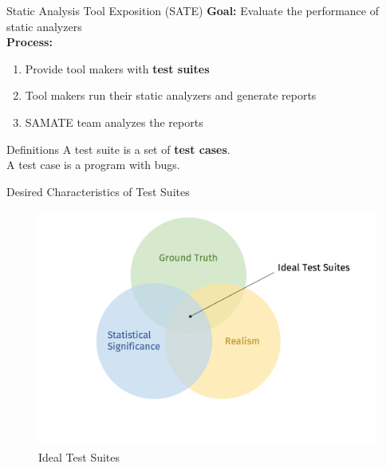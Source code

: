 \documentclass[aspectratio=169]{beamer}
\begin{document}
  \begin{frame}{Static Analysis Tool Exposition (SATE)}
    \textbf{Goal:} \alert{Evaluate the performance of static analyzers}\\
    \pause
    \vfill
    \textbf{Process:}
    \begin{enumerate}
    \item Provide tool makers with \textbf{test suites}
    \item Tool makers run their static analyzers and generate reports
    \item SAMATE team analyzes the reports
    \end{enumerate}
    \pause
    \vfill
    \begin{block}{Definitions}
      \vspace{0.3em}
      A \textcolor{mLightGreen}{test suite} is a set of \textbf{test cases}.\\
      \pause
      \vspace{0.3em}
      A \textcolor{mLightGreen}{test case} is a program with bugs.
    \end{block}
  \end{frame}

  \begin{frame}{Desired Characteristics of Test Suites}
    \begin{figure}
      \centering
      \includegraphics[scale=0.3]{figures/ideal-test-suites}
      \caption{Ideal Test Suites}
    \end{figure}
  \end{frame}
\end{document}

